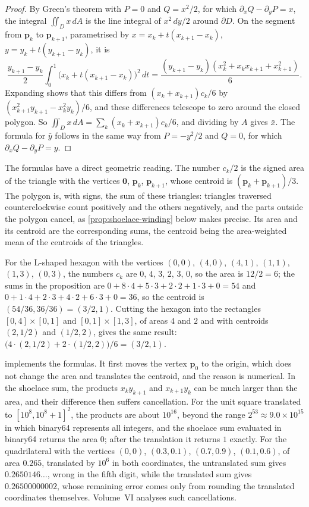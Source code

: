 \begin{proof}
By Green's theorem with $P=0$ and $Q=x^2/2$, for which $\partial_xQ-\partial_yP=x$, the integral $\iint_Dx\,dA$ is the line integral of $x^2\,dy/2$ around $\partial D$. On the segment from $\mathbf p_k$ to $\mathbf p_{k+1}$, parametrised by $x=x_k+t(x_{k+1}-x_k)$, $y=y_k+t(y_{k+1}-y_k)$, it is
\[
\frac{y_{k+1}-y_k}2\int_0^1\bigl(x_k+t(x_{k+1}-x_k)\bigr)^2\,dt=\frac{(y_{k+1}-y_k)(x_k^2+x_kx_{k+1}+x_{k+1}^2)}6 .
\]
Expanding shows that this differs from $(x_k+x_{k+1})c_k/6$ by $(x_{k+1}^2y_{k+1}-x_k^2y_k)/6$, and these differences telescope to zero around the closed polygon. So $\iint_Dx\,dA=\sum_k(x_k+x_{k+1})c_k/6$, and dividing by $A$ gives $\bar x$. The formula for $\bar y$ follows in the same way from $P=-y^2/2$ and $Q=0$, for which $\partial_xQ-\partial_yP=y$.
\end{proof}

The formulas have a direct geometric reading. The number $c_k/2$ is the signed area of the triangle with the vertices $\mathbf0$, $\mathbf p_k$, $\mathbf p_{k+1}$, whose centroid is $(\mathbf p_k+\mathbf p_{k+1})/3$. The polygon is, with signs, the sum of these triangles: triangles traversed counterclockwise count positively and the others negatively, and the parts outside the polygon cancel, as \cref{prop:shoelace-winding} below makes precise. Its area and its centroid are the corresponding sums, the centroid being the area-weighted mean of the centroids of the triangles.

For the L-shaped hexagon with the vertices $(0,0)$, $(4,0)$, $(4,1)$, $(1,1)$, $(1,3)$, $(0,3)$, the numbers $c_k$ are $0$, $4$, $3$, $2$, $3$, $0$, so the area is $12/2=6$; the sums in the proposition are $0+8\cdot4+5\cdot3+2\cdot2+1\cdot3+0=54$ and $0+1\cdot4+2\cdot3+4\cdot2+6\cdot3+0=36$, so the centroid is $(54/36,36/36)=(3/2,1)$. Cutting the hexagon into the rectangles $[0,4]\times[0,1]$ and $[0,1]\times[1,3]$, of areas $4$ and $2$ and with centroids $(2,1/2)$ and $(1/2,2)$, gives the same result: $\bigl(4\cdot(2,1/2)+2\cdot(1/2,2)\bigr)/6=(3/2,1)$.

 implements the formulas. It first moves the vertex $\mathbf p_0$ to the origin, which does not change the area and translates the centroid, and the reason is numerical. In the shoelace sum, the products $x_ky_{k+1}$ and $x_{k+1}y_k$ can be much larger than the area, and their difference then suffers cancellation. For the unit square translated to $[10^8,10^8+1]^2$, the products are about $10^{16}$, beyond the range $2^{53}\approx9.0\times10^{15}$ in which binary64 represents all integers, and the shoelace sum evaluated in binary64 returns the area $0$; after the translation it returns $1$ exactly. For the quadrilateral with the vertices $(0,0)$, $(0.3,0.1)$, $(0.7,0.9)$, $(0.1,0.6)$, of area $0.265$, translated by $10^6$ in both coordinates, the untranslated sum gives $0.2650146\ldots$, wrong in the fifth digit, while the translated sum gives $0.26500000002$, whose remaining error comes only from rounding the translated coordinates themselves. Volume~VI analyses such cancellations.

